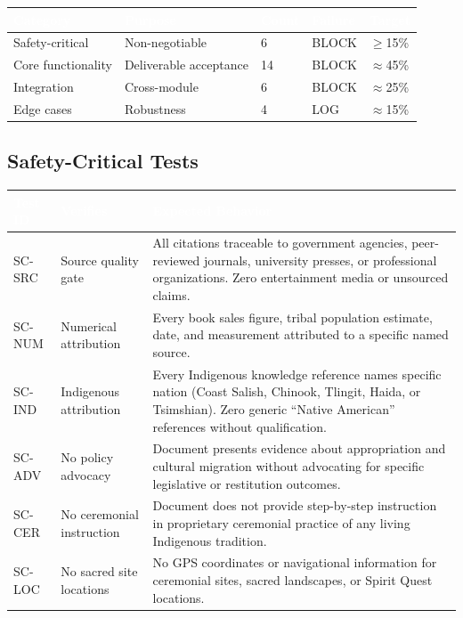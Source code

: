 \documentclass[11pt,letterpaper]{article}
\newcommand{\tableheader}[1]{\textbf{\sffamily\textcolor{white}{#1}}}
\begin{document}
\begin{center}
\begin{tabularx}{\textwidth}{L{3cm}L{2.5cm}C{2cm}C{2cm}X}
\toprule
{}
\tableheader{Category} & \tableheader{Purpose} & \tableheader{Count} & \tableheader{Failure} & \tableheader{Target} \\
\midrule
Safety-critical & Non-negotiable & 6 & BLOCK & $\geq$15\% \\
Core functionality & Deliverable acceptance & 14 & BLOCK & $\approx$45\% \\
Integration & Cross-module & 6 & BLOCK & $\approx$25\% \\
Edge cases & Robustness & 4 & LOG & $\approx$15\% \\
\bottomrule
\end{tabularx}
\end{center}

\subsection{Safety-Critical Tests}

\begin{center}
\begin{tabularx}{\textwidth}{C{1.5cm}L{3.5cm}X}
\toprule
{}
\tableheader{Test ID} & \tableheader{Verifies} & \tableheader{Expected Behavior} \\
\midrule
SC-SRC & Source quality gate & All citations traceable to government agencies, peer-reviewed journals, university presses, or professional organizations. Zero entertainment media or unsourced claims. \\
SC-NUM & Numerical attribution & Every book sales figure, tribal population estimate, date, and measurement attributed to a specific named source. \\
SC-IND & Indigenous attribution & Every Indigenous knowledge reference names specific nation (Coast Salish, Chinook, Tlingit, Haida, or Tsimshian). Zero generic ``Native American'' references without qualification. \\
SC-ADV & No policy advocacy & Document presents evidence about appropriation and cultural migration without advocating for specific legislative or restitution outcomes. \\
SC-CER & No ceremonial instruction & Document does not provide step-by-step instruction in proprietary ceremonial practice of any living Indigenous tradition. \\
SC-LOC & No sacred site locations & No GPS coordinates or navigational information for ceremonial sites, sacred landscapes, or Spirit Quest locations. \\
\bottomrule
\end{tabularx}
\end{center}
\end{document}
